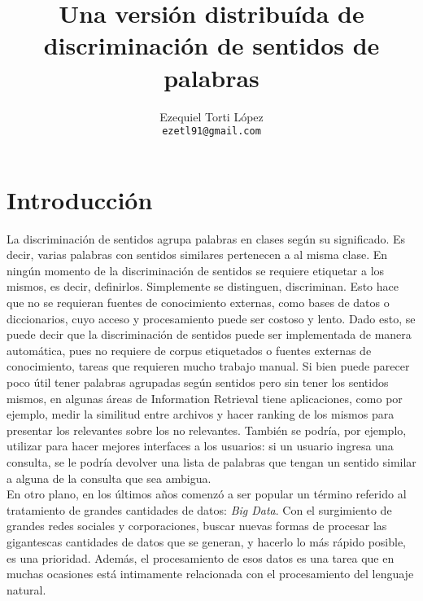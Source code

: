\documentclass[10pt]{article}
\title{\vspace{-15mm}\fontsize{14pt}{10pt}\selectfont\textbf{Una versión distribuída de discriminación de sentidos de palabras}} %
\author{
\normalsize{Ezequiel Torti L\'opez}\\[2mm] %
\texttt{ezetl91@gmail.com} %
}
\begin{document}
\maketitle
{}
\section{Introducción}
La discriminación de sentidos agrupa palabras en clases según su significado. Es decir, varias palabras con sentidos similares pertenecen a al misma clase.
En ningún momento de la discriminación de sentidos se requiere etiquetar a los mismos, es decir, definirlos. Simplemente se distinguen, discriminan. Esto hace que no se requieran fuentes de conocimiento externas, como bases de datos o diccionarios, cuyo acceso y procesamiento puede ser costoso y lento. Dado esto, se puede decir que la discriminación de sentidos puede ser implementada de manera automática, pues no requiere de corpus etiquetados o fuentes externas de conocimiento, tareas que requieren mucho trabajo manual.
Si bien puede parecer poco útil tener palabras agrupadas según sentidos pero sin tener los sentidos mismos, en algunas áreas de Information Retrieval tiene aplicaciones, como por ejemplo, medir la similitud entre archivos y hacer ranking de los mismos para presentar los relevantes sobre los no relevantes. También se podría, por ejemplo, utilizar para hacer mejores interfaces a los usuarios: si un usuario ingresa una consulta, se le podría devolver una lista de palabras que tengan un sentido similar a alguna de la consulta que sea ambigua.
\\
En otro plano, en los últimos años comenzó a ser popular un término referido al tratamiento de grandes cantidades de datos: \emph{Big Data}. Con el surgimiento de grandes redes sociales y corporaciones, buscar nuevas formas de procesar las gigantescas cantidades de datos que se generan, y hacerlo lo más rápido posible, es una prioridad. Además, el procesamiento de esos datos es una tarea que en muchas ocasiones está intimamente relacionada con el procesamiento del lenguaje natural.
\end{document}
